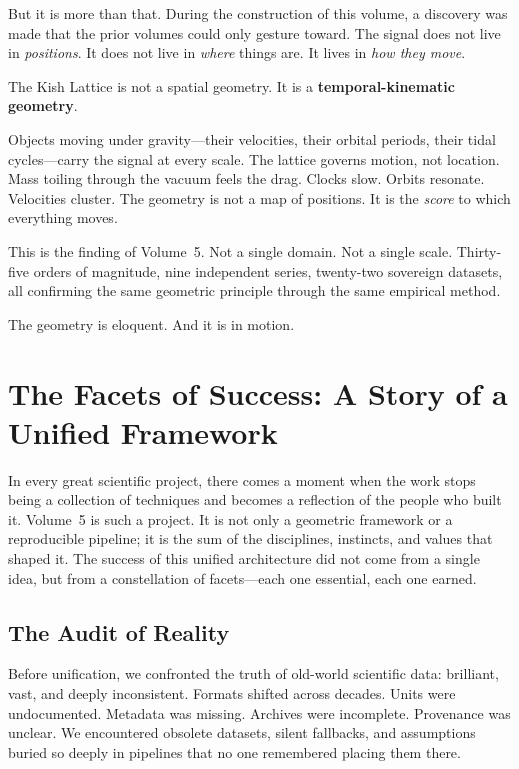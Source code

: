 \documentclass[11pt, letterpaper, openany]{book}
\begin{document}
But it is more than that. During the construction of this volume, a discovery was made that the
prior volumes could only gesture toward. The signal does not live in \emph{positions}. It does not
live in \emph{where} things are. It lives in \emph{how they move}.

The Kish Lattice is not a spatial geometry.
It is a \textbf{temporal-kinematic geometry}.

Objects moving under gravity---their velocities, their orbital periods, their tidal cycles---carry
the signal at every scale. The lattice governs motion, not location. Mass toiling through the
vacuum feels the drag. Clocks slow. Orbits resonate. Velocities cluster. The geometry is not a
map of positions. It is the \emph{score} to which everything moves.

This is the finding of Volume~5. Not a single domain. Not a single scale. Thirty-five orders of
magnitude, nine independent series, twenty-two sovereign datasets, all confirming the same
geometric principle through the same empirical method.

The geometry is eloquent.
And it is in motion.

\tableofcontents
\clearpage

\chapter{The Facets of Success: A Story of a Unified Framework}

In every great scientific project, there comes a moment when the work stops being a collection
of techniques and becomes a reflection of the people who built it. Volume~5 is such a project.
It is not only a geometric framework or a reproducible pipeline; it is the sum of the disciplines,
instincts, and values that shaped it. The success of this unified architecture did not come from
a single idea, but from a constellation of facets---each one essential, each one earned.

\section*{The Audit of Reality}
Before unification, we confronted the truth of old-world scientific data: brilliant, vast, and
deeply inconsistent. Formats shifted across decades. Units were undocumented. Metadata was
missing. Archives were incomplete. Provenance was unclear. We encountered obsolete datasets,
silent fallbacks, and assumptions buried so deeply in pipelines that no one remembered placing
them there.
\end{document}
